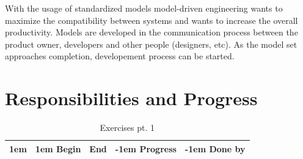 With the usage of standardized models model-driven engineering wants to maximize the compatibility between systems and wants to increase the overall productivity. Models are developed in the communication process between the product owner, developers and other people (designers, etc). As the model set approaches completion, developement process can be started.

\section{Responsibilities and Progress}
\begin{table}[htbp]
  \caption{Exercises pt. 1}
  \noindent\hspace*{-1cm}\begin{tabularx}{\textwidth+2cm}{
>{\raggedleft\arraybackslash\advance\hsize1em}X
>{\raggedright\arraybackslash\advance\hsize1em }X
>{\raggedright\arraybackslash}X
>{\raggedright\arraybackslash\advance\hsize-1em }X
>{\raggedright\arraybackslash\advance\hsize-1em }X
}
    \addlinespace
    \toprule
    \multicolumn{1}{c}{Exercise } & Begin & End  & Progress & Done by   \\
    \midrule
         

\end{tabularx}
\end{table}

